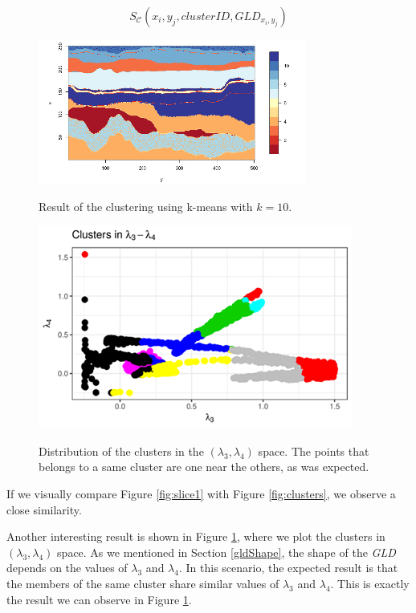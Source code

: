 \documentclass[11pt]{article}
\begin{document}
\begin{equation}\label{eq:clustersresult}
S_{\mathcal{C}}(x_{i},y_{j},clusterID, GLD_{x_{i},y_{j}})
\end{equation}

\begin{figure}[!ht]
\begin{multicols}{2}
    \centering
        \includegraphics{figs/clusters_image.png}
    \caption{Result of the clustering using k-means with
    $k=10$.}
    \label{fig:clusters}
    \centering
    \includegraphics{figs/clusters_l3_l4.png}
    \caption{Distribution of the clusters in the $(\lambda_{3}, \lambda_{4})$ space. The points that belongs to a same cluster are one near the others, as was expected.}
    \label{fig:clusters_lambda3_lambda4_space}
\end{multicols}
\end{figure}


If we visually compare Figure \ref{fig:slice1} with Figure \ref{fig:clusters}, we observe a close similarity. 

Another interesting result is shown in Figure \ref{fig:clusters_lambda3_lambda4_space}, where we plot the clusters in $(\lambda_{3}, \lambda_{4})$ space. As we mentioned in Section \ref{gldShape}, the shape of the \textit{GLD} depends on the values of $\lambda_{3}$ and $\lambda_{4}$. In this scenario, the expected result is that the members of the same cluster share similar values of $\lambda_{3}$ and $\lambda_{4}$. This is exactly the result we can observe in Figure \ref{fig:clusters_lambda3_lambda4_space}. 
\end{document}
